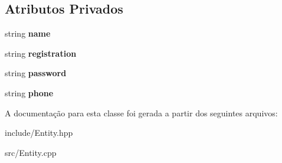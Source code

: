 \subsection*{Atributos Privados}
\begin{DoxyCompactItemize}
\item 
string {\bfseries name}\hypertarget{classProjectManager_ad96b0c6062333f7824f122ef0a9be564}{}\label{classProjectManager_ad96b0c6062333f7824f122ef0a9be564}

\item 
string {\bfseries registration}\hypertarget{classProjectManager_aa88e1ca5bd5791809e0eb868ce2f5b5e}{}\label{classProjectManager_aa88e1ca5bd5791809e0eb868ce2f5b5e}

\item 
string {\bfseries password}\hypertarget{classProjectManager_a9ce12ba24d0f516071c3ded6295b53b2}{}\label{classProjectManager_a9ce12ba24d0f516071c3ded6295b53b2}

\item 
string {\bfseries phone}\hypertarget{classProjectManager_a046bb64737ddf36ccb911645daa5a6e1}{}\label{classProjectManager_a046bb64737ddf36ccb911645daa5a6e1}

\end{DoxyCompactItemize}


A documentação para esta classe foi gerada a partir dos seguintes arquivos\+:\begin{DoxyCompactItemize}
\item 
include/Entity.\+hpp\item 
src/Entity.\+cpp\end{DoxyCompactItemize}
